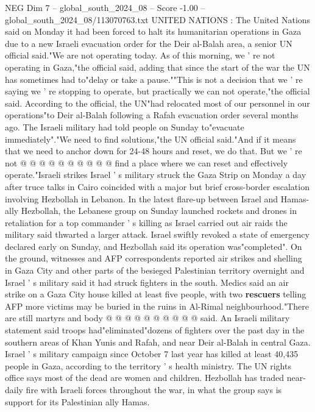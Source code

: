\begin{textsample}{NEG Dim 7 – global\_south\_2024\_08 – Score -1.00 – global\_south\_2024\_08/113070763.txt}  \label{ex:f7_neg_271}
UNITED NATIONS : The United Nations said on Monday it had been forced to halt its humanitarian operations in Gaza due to a new Israeli evacuation order for the Deir al-Balah area, a senior UN official said."We are not operating today.
As of this morning, we ' re not operating in Gaza,"the official said, adding that since the start of the war the UN has sometimes had to"delay or take a pause.""This is not a decision that we ' re saying we ' re stopping to operate, but practically we can not operate,"the official said.
According to the official, the UN"had relocated most of our personnel in our operations"to Deir al-Balah following a Rafah evacuation order several months ago.
The Israeli military had told people on Sunday to"evacuate immediately"."We need to find solutions,"the UN official said."And if it means that we need to anchor down for 24-48 hours and reset, we do that.
But we ' re not @ @ @ @ @ @ @ @ @ @ find a place where we can reset and effectively operate."Israeli strikes Israel ' s military struck the Gaza Strip on Monday a day after truce talks in Cairo coincided with a major but brief cross-border escalation involving Hezbollah in Lebanon.
In the latest flare-up between Israel and Hamas-ally Hezbollah, the Lebanese group on Sunday launched rockets and drones in retaliation for a top commander ' s killing as Israel carried out air raids the military said thwarted a larger attack.
Israel swiftly revoked a state of emergency declared early on Sunday, and Hezbollah said its operation was"completed".
On the ground, witnesses and AFP correspondents reported air strikes and shelling in Gaza City and other parts of the besieged Palestinian territory overnight and Israel ' s military said it had struck fighters in the south.
Medics said an air strike on a Gaza City house killed at least five people, with two \textbf{rescuers} telling AFP more victims may be buried in the ruins in Al-Rimal neighbourhood."There are still martyrs and body @ @ @ @ @ @ @ @ @ @ said.
An Israeli military statement said troops had"eliminated"dozens of fighters over the past day in the southern areas of Khan Yunis and Rafah, and near Deir al-Balah in central Gaza.
Israel ' s military campaign since October 7 last year has killed at least 40,435 people in Gaza, according to the territory ' s health ministry.
The UN rights office says most of the dead are women and children.
Hezbollah has traded near-daily fire with Israeli forces throughout the war, in what the group says is support for its Palestinian ally Hamas.

\end{textsample}
